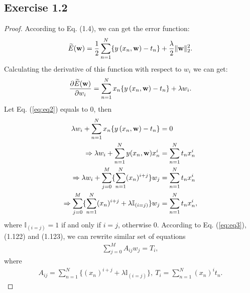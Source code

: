 \documentclass[11pt]{article}
\theoremstyle{definition}
\begin{document}
\subsection{Exercise 1.2}
\begin{proof}
According to Eq. (1.4), we can get the error function:
\begin{align*}
\widetilde{E}(\bold{w}) = \frac{1}{2}\sum^{N}_{n=1} \{ y\left(x_n,\bold{w}\right) - t_n \} + \frac{\lambda}{2}\lVert\bold{w}\rVert^2_2.
\end{align*}
Calculating the derivative of this function with respect to $w_i$ we can get:
\begin{align}
\frac{\partial \widetilde{E}(\bold{w})}{\partial w_i} = \sum^{N}_{n=1}x_n\{y\left(x_n,\bold{w}\right) - t_n\} + \lambda w_i.  \label{eq:eq2}   
\end{align}
Let Eq. (\ref{eq:eq2}) equals to 0, then
\begin{align}
\lambda w_i + \sum^{N}_{n=1}x_n\{y\left(x_n,\bold{w}\right) - t_n\} &= 0 \nonumber\\
\Rightarrow\lambda w_i +  \sum^N_{n=1}y(x_n,\bold{w})x_n^i &= \sum^N_{n=1}t_nx_n^i \nonumber\\
\Rightarrow\lambda w_i +   \sum^M_{j=0}\{\sum^N_{n=1}(x_n)^{i+j}\}w_j &= \sum^N_{n=1}t_nx_n^i \nonumber\\
\Rightarrow\sum^M_{j=0}\{\sum^N_{n=1}(x_n)^{i+j}+\lambda\mathbb{I}_{(i=j)}\}w_j &= \sum^N_{n=1}t_nx_n^i, \label{eq:eq3}
\end{align}
where $\mathbb{I}_{(i=j)} = 1$ if and only if $i=j$, otherwise 0.
According to Eq. (\ref{eq:eq3}), (1.122) and (1.123), we can rewrite similar set of equations
\begin{equation*}
\begin{aligned}
\sum^{M}_{j=0}A_{ij}w_j = T_i,
\end{aligned}
\end{equation*}
where
\begin{equation*}
\begin{aligned}
A_{ij} = \sum^N_{n=1}\{(x_n)^{i+j}+\lambda\mathbb{I}_{(i=j)}\},\  T_i = \sum^N_{n=1}(x_n)^it_n.
\end{aligned}
\end{equation*}
\end{proof}
\end{document}
